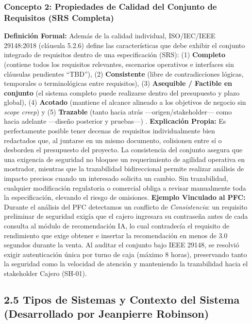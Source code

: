 \subsubsection{Concepto 2: Propiedades de Calidad del Conjunto de Requisitos (SRS Completa)}
\textbf{Definición Formal:} Además de la calidad individual, ISO/IEC/IEEE 29148:2018 (cláusula 5.2.6) define las características que debe exhibir el conjunto integrado de requisitos dentro de una especificación (SRS): (1) \textbf{Completo} (contiene todos los requisitos relevantes, escenarios operativos e interfaces sin cláusulas pendientes ``TBD''), (2) \textbf{Consistente} (libre de contradicciones lógicas, temporales o terminológicas entre requisitos), (3) \textbf{Asequible / Factible en conjunto} (el sistema completo puede realizarse dentro del presupuesto y plazo global), (4) \textbf{Acotado} (mantiene el alcance alineado a los objetivos de negocio sin \textit{scope creep}) y (5) \textbf{Trazable} (tanto hacia atrás —origen/stakeholder— como hacia adelante —diseño posterior y pruebas—) \cite{ieee29148, swebok2024}.
\textbf{Explicación Propia:} Es perfectamente posible tener decenas de requisitos individualmente bien redactados que, al juntarse en un mismo documento, colisionen entre sí o desborden el presupuesto del proyecto. La consistencia del conjunto asegura que una exigencia de seguridad no bloquee un requerimiento de agilidad operativa en mostrador, mientras que la trazabilidad bidireccional permite realizar análisis de impacto precisos cuando un interesado solicita un cambio. Sin trazabilidad, cualquier modificación regulatoria o comercial obliga a revisar manualmente toda la especificación, elevando el riesgo de omisiones.
\textbf{Ejemplo Vinculado al PFC:} Durante el análisis del PFC detectamos un conflicto de \textit{Consistencia}: un requisito preliminar de seguridad exigía que el cajero ingresara su contraseña antes de cada consulta al módulo de recomendación IA, lo cual contradecía el requisito de rendimiento que exige obtener e insertar la recomendación en menos de 3.0 segundos durante la venta. Al auditar el conjunto bajo IEEE 29148, se resolvió exigir autenticación única por turno de caja (máximo 8 horas), preservando tanto la seguridad como la velocidad de atención y manteniendo la trazabilidad hacia el stakeholder Cajero (SH-01).
\subsection{2.5 Tipos de Sistemas y Contexto del Sistema (Desarrollado por Jeanpierre Robinson)}
